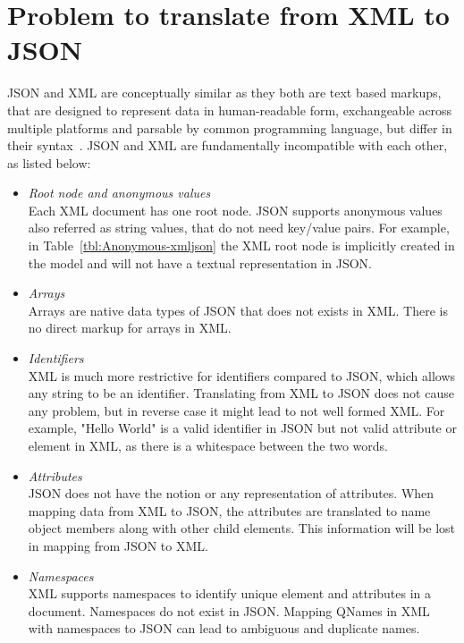 \section{Problem to translate from XML to JSON}
JSON and XML are conceptually similar as they both are text based markups, that are designed to represent data in human-readable form, exchangeable across multiple platforms and parsable by common programming language, but differ in their syntax~\citep{lee2011jxon}. JSON and XML are fundamentally incompatible with each other, as listed below:
\begin{itemize}
\item \textit{Root node and anonymous values}
\\
Each XML document has one root node. JSON supports anonymous values also referred as string values, that do not need key/value pairs. For example, in Table~\ref{tbl:Anonymous-xmljson} the XML root node is implicitly created in the model and will not have a textual representation in JSON.

	\item \textit{Arrays}\\
		Arrays are native data types of JSON that does not exists in XML. There is no direct markup for arrays in XML.
		\item \textit{Identifiers}\\
		XML is much more restrictive for identifiers compared to JSON, which allows any string to be an identifier. Translating from XML to JSON does not cause any problem, but in reverse case it might lead to not well formed XML. For example, "Hello World" is a valid identifier in JSON but not valid attribute or element in XML, as there is a whitespace between the two words.
		\item \textit{Attributes}\\
		JSON does not have the notion or any representation of attributes. When mapping data from XML to JSON, the attributes are translated to name object members along with other child elements. This information will be lost in mapping from JSON to XML.
		\item \textit{Namespaces}\\
		XML supports namespaces to identify  unique element and attributes in a document. Namespaces do not exist in JSON. Mapping QNames in XML with namespaces to JSON can lead to ambiguous and duplicate names.
\end{itemize}

